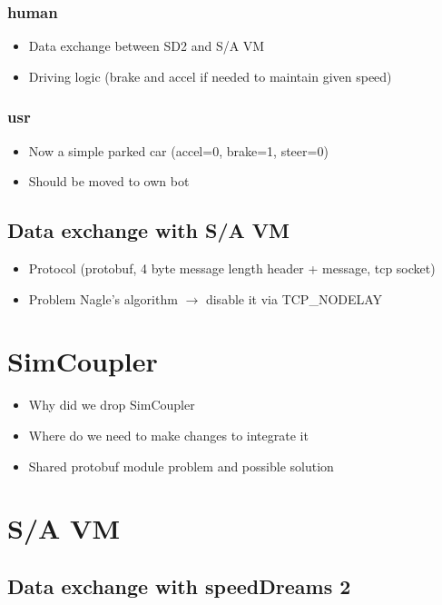 \documentclass[paper=a4, fontsize=11pt]{scrartcl}
\begin{document}
\subsubsection{human}
\begin{itemize}
  \item Data exchange between SD2 and S/A VM
  \item Driving logic (brake and accel if needed to maintain given speed)
\end{itemize}
\subsubsection{usr}
\begin{itemize}
  \item Now a simple parked car (accel=0, brake=1, steer=0)
  \item Should be moved to own bot
\end{itemize}
\subsection{Data exchange with S/A VM}
\begin{itemize}
  \item Protocol (protobuf, 4 byte message length header + message, tcp socket)
  \item Problem Nagle's algorithm $\rightarrow$ disable it via TCP\_NODELAY
\end{itemize}
\section{SimCoupler}
\begin{itemize}
  \item Why did we drop SimCoupler
  \item Where do we need to make changes to integrate it
  \item Shared protobuf module problem and possible solution
\end{itemize}
\section{S/A VM}
\subsection{Data exchange with speedDreams 2}
\end{document}
